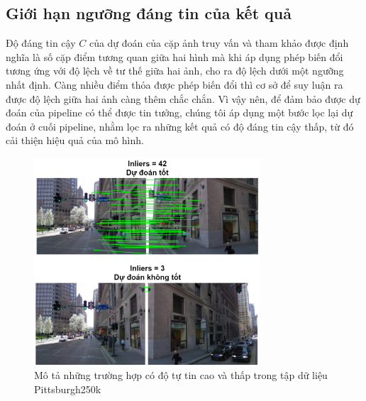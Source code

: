 \subsection{Giới hạn ngưỡng đáng tin của kết quả}

Độ đáng tin cậy $C$ của dự đoán của cặp ảnh truy vấn và tham khảo được định nghĩa là số cặp điểm tương quan giữa hai hình mà khi áp dụng phép biến đổi tương ứng với độ lệch về tư thế giữa hai ảnh, cho ra độ lệch dưới một ngưỡng nhất định. Càng nhiều điểm thỏa được phép biến đổi thì cơ sở để suy luận ra được độ lệch giữa hai ảnh càng thêm chắc chắn. Vì vậy nên, để đảm bảo được dự đoán của pipeline có thể được tin tưởng, chúng tôi áp dụng một bước lọc lại dự đoán ở cuối pipeline, nhằm lọc ra những kết quả có độ đáng tin cậy thấp, từ đó cải thiện hiệu quả của mô hình.

\begin{figure}[H]
  \centering
  \includegraphics[width=0.75\textwidth]{pics/Proposal/threshold.png}
  \caption[Những dự đoán tốt và không tốt đánh giá theo độ tin cậy]{Mô tả những trường hợp có độ tự tin cao và thấp trong tập dữ liệu Pittsburgh250k \cite{6618963}}
\end{figure}

